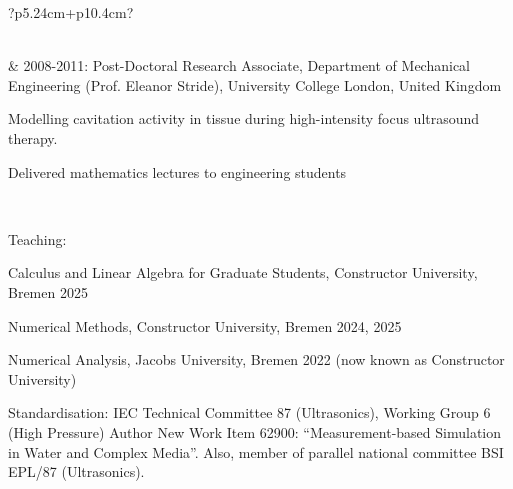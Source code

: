 \documentclass[checked=true, walterbenjamin=false]{dfg-cv-en}
\begin{document}
\begin{longtable}{?p{5.24cm}+p{10.4cm}?}
\begin{compactItemize}
\end{compactItemize}	\\
& 2008-2011: Post-Doctoral Research Associate, Department of Mechanical Engineering (Prof. Eleanor Stride), University College London, United Kingdom
\begin{compactItemize}
\item Modelling cavitation activity in tissue during high-intensity focus ultrasound therapy.
\item Delivered mathematics lectures to engineering students
\end{compactItemize}	 \\
		\hline
    		\end{longtable}


\secSupplementary 

\secEngagement 
\begin{compactItemize}
\item Teaching: 
\begin{compactItemize}
\item Calculus and Linear Algebra for Graduate Students, Constructor University, Bremen 2025
\item Numerical Methods, Constructor University, Bremen 2024, 2025 
\item Numerical Analysis, Jacobs University, Bremen 2022 (now known as Constructor University)
\end{compactItemize}
\item Standardisation: IEC Technical Committee 87 (Ultrasonics), Working Group 6 (High Pressure) Author New Work Item 62900: \enquote{Measurement-based Simulation in Water and Complex Media}. Also, member of parallel national committee BSI EPL/87 (Ultrasonics). 
\end{compactItemize}
\end{document}
